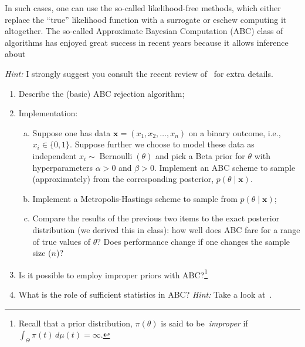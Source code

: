 \documentclass[a4paper,10pt, notitlepage]{report}
\begin{document}
In such cases, one can use the so-called likelihood-free methods, which either replace the ``true'' likelihood function with a surrogate or eschew computing it altogether.
The so-called Approximate Bayesian Computation (ABC) class of algorithms has enjoyed great success in recent years because it allows inference about 

\textit{Hint:} I strongly suggest you consult the recent review of~\cite{Beaumont2019} for extra details. 
\begin{enumerate}
 \item Describe the (basic) ABC rejection algorithm;
 \item Implementation:
\begin{enumerate}[(a)]
  \item Suppose one has data $\boldsymbol{x} = (x_1, x_2, \ldots, x_n)$ on a binary outcome, i.e., $x_i \in \{0, 1\}$.
  Suppose further we choose to model these data as independent $x_i \sim \operatorname{Bernoulli}(\theta)$ and pick a Beta prior for $\theta$ with hyperparameters $\alpha>0$ and $\beta>0$.  
  Implement an ABC scheme to sample (approximately) from the corresponding posterior, $p(\theta \mid \boldsymbol{x})$.
  \item Implement a Metropolis-Hastings scheme to sample from $p(\theta \mid \boldsymbol{x})$;
  \item Compare the results of the previous two items to the exact posterior distribution (we derived this in class): how well does ABC fare for a range of true values of $\theta$? 
  Does performance change if one changes the sample size ($n$)?
 \end{enumerate} 
 \item Is it possible to employ improper priors with ABC?\footnote{Recall that a prior distribution, $\pi(\theta)$ is said to be~\textit{improper} if $\int_{\Theta} \pi(t)\,d\mu(t) = \infty$.}
 \item What is the role of sufficient statistics in ABC? 
 \textit{Hint:} Take a look at~\cite{Robert2011}.
\end{enumerate}
 


\end{document}
